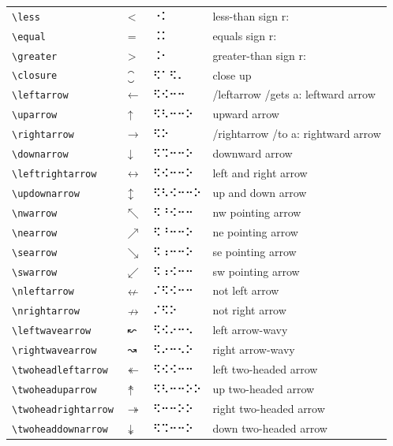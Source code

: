 \documentclass[oneside]{article}
\begin{document}
\begin{longtable}{llll}
\verb|\less| & $\less$ &   ⠐⠅   & {less-than sign r:} \\[2ex]
\verb|\equal| & $\equal$ &   ⠨⠅   & {equals sign r:} \\[2ex]
\verb|\greater| & $\greater$ &   ⠨⠂   & {greater-than sign r:} \\[2ex]
\verb|\closure| & $\closure$ &   ⠫⠁⠫⠄   & {close up} \\[2ex]
\verb|\leftarrow| & $\leftarrow$ &   ⠫⠪⠒⠒   & {/leftarrow /gets a: leftward arrow} \\[2ex]
\verb|\uparrow| & $\uparrow$ &   ⠫⠣⠒⠒⠕   & {upward arrow} \\[2ex]
\verb|\rightarrow| & $\rightarrow$ &   ⠫⠕   & {/rightarrow /to a: rightward arrow} \\[2ex]
\verb|\downarrow| & $\downarrow$ &   ⠫⠩⠒⠒⠕   & {downward arrow} \\[2ex]
\verb|\leftrightarrow| & $\leftrightarrow$ &   ⠫⠪⠒⠒⠕   & {left and right arrow} \\[2ex]
\verb|\updownarrow| & $\updownarrow$ &   ⠫⠣⠪⠒⠒⠕   & {up and down arrow} \\[2ex]
\verb|\nwarrow| & $\nwarrow$ &   ⠫⠘⠪⠒⠒   & {nw pointing arrow} \\[2ex]
\verb|\nearrow| & $\nearrow$ &   ⠫⠘⠒⠒⠕   & {ne pointing arrow} \\[2ex]
\verb|\searrow| & $\searrow$ &   ⠫⠰⠒⠒⠕   & {se pointing arrow} \\[2ex]
\verb|\swarrow| & $\swarrow$ &   ⠫⠰⠪⠒⠒   & {sw pointing arrow} \\[2ex]
\verb|\nleftarrow| & $\nleftarrow$ &   ⠌⠫⠪⠒⠒   & {not left arrow} \\[2ex]
\verb|\nrightarrow| & $\nrightarrow$ &   ⠌⠫⠕   & {not right arrow} \\[2ex]
\verb|\leftwavearrow| & $\leftwavearrow$ &   ⠫⠪⠔⠒⠢   & {left arrow-wavy} \\[2ex]
\verb|\rightwavearrow| & $\rightwavearrow$ &   ⠫⠔⠒⠢⠕   & {right arrow-wavy} \\[2ex]
\verb|\twoheadleftarrow| & $\twoheadleftarrow$ &   ⠫⠪⠪⠒⠒   & {left two-headed arrow} \\[2ex]
\verb|\twoheaduparrow| & $\twoheaduparrow$ &   ⠫⠣⠒⠒⠕⠕   & {up two-headed arrow} \\[2ex]
\verb|\twoheadrightarrow| & $\twoheadrightarrow$ &   ⠫⠒⠒⠕⠕   & {right two-headed arrow} \\[2ex]
\verb|\twoheaddownarrow| & $\twoheaddownarrow$ &   ⠫⠩⠒⠒⠕   & {down two-headed arrow} \\[2ex]

\end{longtable}
\end{document}
